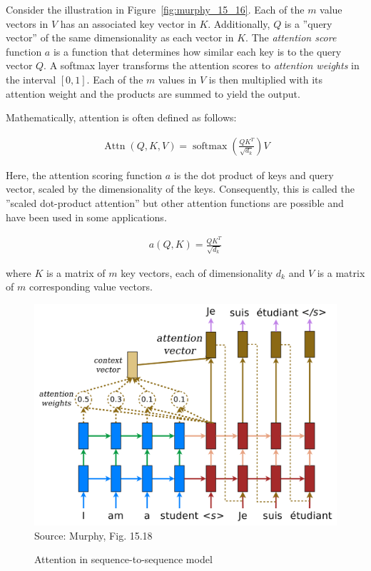 Consider the illustration in Figure~\ref{fig:murphy_15_16}. Each of the $m$ value vectors in $V$ has an associated key vector in $K$. Additionally, $Q$ is a ''query vector'' of the same dimensionality as each vector in $K$. The \emph{attention score} function $a$ is a function that determines how similar each key is to the query vector $Q$. A softmax layer transforms the attention scores to \emph{attention weights} in the interval $[0, 1]$. Each of the $m$ values in $V$ is then multiplied with its attention weight and the products are summed to yield the output.  

Mathematically, attention is often defined as follows:

\begin{align*}
\operatorname{Attn}(Q, K, V) = \operatorname{softmax}\left(\frac{Q K^T}{\sqrt{d_k}} \right) V
\end{align*}

Here, the attention scoring function $a$ is the dot product of keys and query vector, scaled by the dimensionality of the keys. Consequently, this is called the ''scaled dot-product attention'' but other attention functions are possible and have been used in some applications. 

\begin{align*}
a(Q, K) = \frac{Q K^T}{\sqrt{d_k}}
\end{align*}

where $K$ is a matrix of $m$ key vectors, each of dimensionality $d_k$ and $V$ is a matrix of $m$ corresponding value vectors. 

\begin{figure}
\centering

\includegraphics[width=.8\textwidth]{murphy_15_18.png} \\

\scriptsize Source: Murphy, Fig. 15.18 \normalsize
\caption{Attention in sequence-to-sequence model}
\label{fig:murphy_15_18}
\end{figure}

